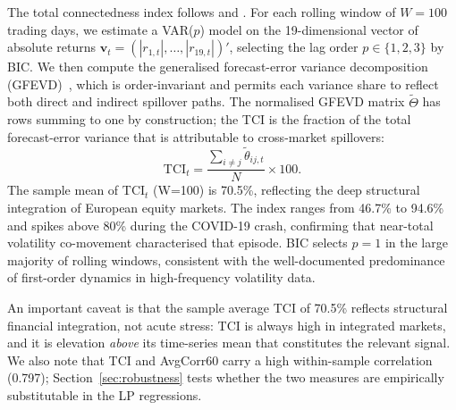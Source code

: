 \documentclass[11pt]{article}
\begin{document}
The total connectedness index follows \citet{dieboldyilmaz2012} and
\citet{pesaranshim1998}.
For each rolling window of $W = 100$ trading days, we estimate a VAR($p$)
model on the 19-dimensional vector of absolute returns
$\mathbf{v}_t = (|r_{1,t}|, \ldots, |r_{19,t}|)'$,
selecting the lag order $p \in \{1,2,3\}$ by BIC.
We then compute the generalised forecast-error variance decomposition
(GFEVD)~\citep{pesaranshim1998}, which is order-invariant and permits each
variance share to reflect both direct and indirect spillover paths.
The normalised GFEVD matrix $\tilde{\Theta}$ has rows summing to one by
construction; the TCI is the fraction of the total forecast-error variance
that is attributable to cross-market spillovers:
\begin{equation}
  \text{TCI}_t = \frac{\sum_{i \neq j} \tilde{\theta}_{ij,t}}{N} \times 100.
\end{equation}
The sample mean of $\text{TCI}_t$ (W=100) is 70.5\%, reflecting the deep
structural integration of European equity markets.
The index ranges from 46.7\% to 94.6\% and spikes above 80\% during the
COVID-19 crash, confirming that near-total volatility co-movement
characterised that episode.
BIC selects $p = 1$ in the large majority of rolling windows,
consistent with the well-documented predominance of first-order dynamics
in high-frequency volatility data.

An important caveat is that the sample average TCI of 70.5\% reflects
structural financial integration, not acute stress: TCI is always high
in integrated markets, and it is elevation \emph{above} its time-series
mean that constitutes the relevant signal.
We also note that TCI and AvgCorr60 carry a high within-sample correlation
(0.797); Section~\ref{sec:robustness} tests whether the two measures are
empirically substitutable in the LP regressions.
\end{document}
